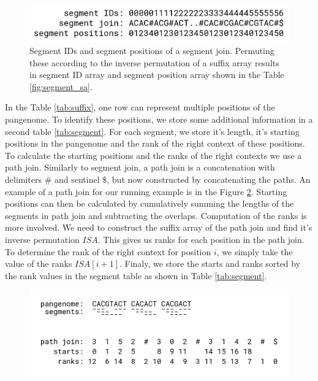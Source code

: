 \documentclass[twocolumn]{ceurart}
\begin{document}
\begin{figure}
    \centering
    \includegraphics[width=\linewidth]{images/ids_and_positions.png}
    \caption{
        Segment IDs and segment positions of a segment join. Permuting these
        according to the inverse permutation of a suffix array results in 
        segment ID array and segment position array shown in the Table \ref{fig:segment_sa}.
    }
    \label{fig:ids_and_positions}
\end{figure}



In the Table \ref{tab:suffix}, one row can represent multiple positions of the
pangenome.
To identify these positions, we store some additional information in a second
table \ref{tab:segment}.
For each segment, we store it's length, it's starting positions in the pangenome
and the rank of the right context of these positions.
To calculate the starting positions and the ranks of the right contexts we use
a path join.
Similarly to segment join, a path join is a concatenation with delimiters $\#$
and sentinel $\$$, but now constructed by concatenating the paths.
An example of a path join for our running example is in the Figure \ref{fig:path_join}.
Starting positions can then be calculated by cumulatively summing the lengths
of the segments in path join and subtracting the overlaps.
Computation of the ranks is more involved.
We need to construct the suffix array of the path join and find it's inverse
permutation $ISA$.
This gives us ranks for each position in the path join.
To determine the rank of the right context for position $i$, we simply take
the value of the ranks $ISA[i+1]$.
Finaly, we store the starts and ranks sorted by the rank values in the segment
table as shown in Table \ref{tab:segment}.

\begin{figure}
    \centering
    \includegraphics[width=\linewidth]{images/path_join.png}
    \caption{}
    \label{fig:path_join}
\end{figure}
\end{document}
